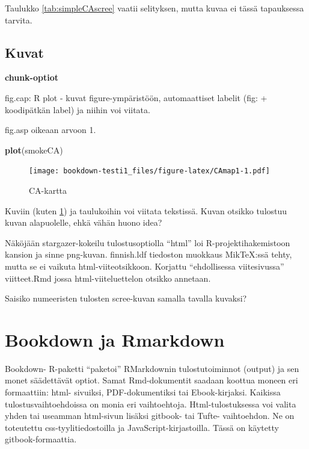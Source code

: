 \documentclass[finnish,]{book}
\newenvironment{Shaded}{\begin{snugshade}}{\end{snugshade}}
\newcommand{\KeywordTok}[1]{\textcolor[rgb]{0.13,0.29,0.53}{\textbf{#1}}}
\newcommand{\NormalTok}[1]{#1}
\begin{document}
Taulukko \ref{tab:simpleCAscree} vaatii selityksen, mutta kuvaa ei tässä tapauksessa tarvita.

\hypertarget{kuvat}{%
\section{Kuvat}\label{kuvat}}

\textbf{chunk-optiot}

fig.cap: R plot - kuvat figure-ympäristöön, automaattiset labelit (fig: + koodipätkän label) ja niihin voi viitata.

fig.asp oikeaan arvoon 1.

\begin{Shaded}
\begin{Highlighting}[]
\KeywordTok{plot}\NormalTok{(smokeCA)}
\end{Highlighting}
\end{Shaded}

\begin{figure}
\centering
\texttt{[image: bookdown-testi1\_files/figure-latex/CAmap1-1.pdf]}
\caption{\label{fig:CAmap1}CA-kartta}
\end{figure}

Kuviin (kuten \ref{fig:CAmap1}) ja taulukoihin voi viitata tekstissä. Kuvan otsikko tulostuu kuvan alapuolelle, ehkä vähän huono idea?

Näköjään stargazer-kokeilu tulostusoptiolla ``html'' loi R-projektihakemistoon kansion ja sinne png-kuvan.
finnish.ldf tiedoston muokkaus MikTeX:ssä tehty, mutta se ei vaikuta html-viiteotsikkoon. Korjattu ``ehdollisessa viitesivussa'' viitteet.Rmd jossa html-viiteluettelon otsikko annetaan.

Saisiko numeeristen tulosten scree-kuvan samalla tavalla kuvaksi?

\hypertarget{bookdown-ja-rmarkdown}{%
\chapter{Bookdown ja Rmarkdown}\label{bookdown-ja-rmarkdown}}

Bookdown- R-paketti ``paketoi'' RMarkdownin tulostutoiminnot (output) ja sen monet säädettävät optiot. Samat Rmd-dokumentit saadaan koottua moneen eri formaattiin: html- sivuiksi, PDF-dokumentiksi tai Ebook-kirjaksi. Kaikissa tulostusvaihtoehdoissa on monia eri vaihtoehtoja. Html-tulostuksessa voi valita yhden tai useamman html-sivun lisäksi gitbook- tai Tufte- vaihtoehdon. Ne on toteutettu css-tyylitiedostoilla ja JavaScript-kirjastoilla. Tässä on käytetty gitbook-formaattia.
\end{document}
